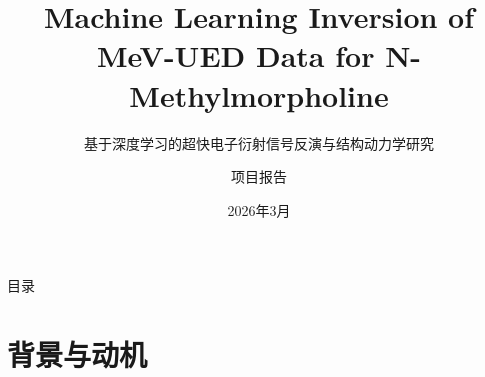 \documentclass[aspectratio=169,9pt]{beamer}
\title[NMM UED ML]{%
  {\Large\textbf{Machine Learning Inversion of}}\\
  {\Large\textbf{MeV-UED Data for N-Methylmorpholine}}
}
\subtitle{基于深度学习的超快电子衍射信号反演与结构动力学研究}
\author{项目报告}
\institute{上海交通大学\quad 激光等离子体教育部重点实验室}
\date{2026年3月}
\begin{document}

\begin{frame}
  \titlepage
\end{frame}

\begin{frame}{目录}
  \tableofcontents[hideallsubsections]
\end{frame}

\section{背景与动机}
\end{document}
